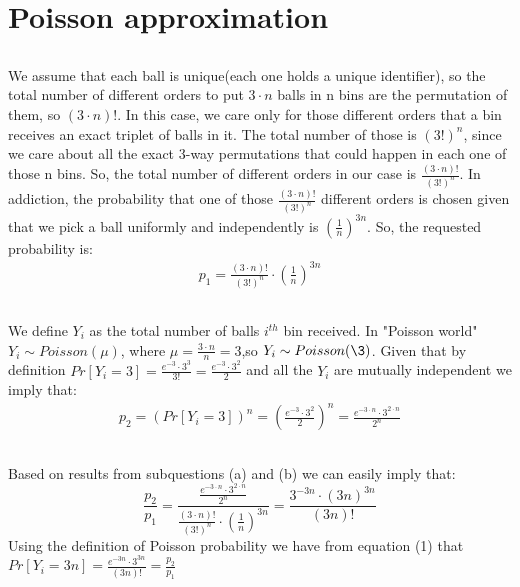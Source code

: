 \documentclass[11pt]{537homework}
\author{Emmanouil Kritharakis}
\begin{document}
\section{Poisson approximation}


\subsection{}
We assume that each ball is unique(each one holds a unique identifier), so the total number of different orders to put $3\cdot n$ balls in n bins are the permutation of them, so $(3 \cdot n)!$. In this case, we care only for those different orders that a bin receives an exact triplet of balls in it. The total number of those is $(3!)^n$, since we care about all the exact 3-way permutations that could happen in each one of those n bins. So, the total number of different orders in our case is $\displaystyle{\frac{(3\cdot n)!}{(3!)^n}}$. In addiction, the probability that one of those $\displaystyle{\frac{(3\cdot n)!}{(3!)^n}}$ different orders is chosen given that we pick a ball uniformly and independently is $(\frac{1}{n})^{3n}$. So, the requested probability is:
\begin{align*}
p_1 =  \displaystyle{\frac{(3\cdot n)!}{(3!)^n} \cdot (\frac{1}{n})^{3n}}
\end{align*}
\subsection{}
We define $Y_i$ as the total number of balls $i^{th}$ bin received. In "Poisson world" $Y_i \sim Poisson(\mu)$, where $\mu = \frac{3\cdot n}{n} = 3$,so $Y_i \sim Poisson(\3)$. Given that by definition $Pr[Y_i = 3] = \frac{e^{-3} \cdot 3^3}{3!} = \frac{e^{-3} \cdot 3^2}{2} $ and all the $Y_i$ are mutually independent we imply that:
\begin{align*}
p_2 =  (Pr[Y_i = 3])^n = (\frac{e^{-3} \cdot 3^2}{2})^n = \frac{e^{-3 \cdot n} \cdot 3^{2\cdot n}}{2^n}
\end{align*}
\subsection{}
Based on results from subquestions (a) and (b) we can easily imply that:
\begin{equation}
\frac{p_2}{p_1} =  \frac{\frac{e^{-3 \cdot n} \cdot 3^{2\cdot n}}{2^n}}{\frac{(3\cdot n)!}{(3!)^n} \cdot (\frac{1}{n})^{3n}} = \displaystyle{\frac{3^{-3n} \cdot (3n)^{3n}}{(3n)!}} 
\end{equation}
Using the definition of Poisson probability we have from equation (1) that $\displaystyle{Pr[Y_i = 3n] = \frac{e^{-3n} \cdot 3^{3n}}{(3n)!}} = \frac{p_2}{p_1}$
\end{document}
